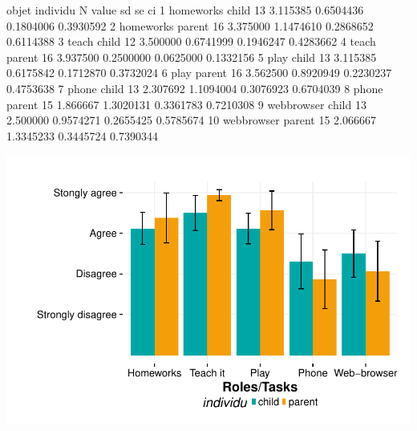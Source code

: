 \documentclass{article}
\begin{document}
\begin{Schunk}
\begin{Soutput}
        objet individu  N    value        sd        se        ci
1   homeworks    child 13 3.115385 0.6504436 0.1804006 0.3930592
2   homeworks   parent 16 3.375000 1.1474610 0.2868652 0.6114388
3       teach    child 12 3.500000 0.6741999 0.1946247 0.4283662
4       teach   parent 16 3.937500 0.2500000 0.0625000 0.1332156
5        play    child 13 3.115385 0.6175842 0.1712870 0.3732024
6        play   parent 16 3.562500 0.8920949 0.2230237 0.4753638
7       phone    child 13 2.307692 1.1094004 0.3076923 0.6704039
8       phone   parent 15 1.866667 1.3020131 0.3361783 0.7210308
9  webbrowser    child 13 2.500000 0.9574271 0.2655425 0.5785674
10 webbrowser   parent 15 2.066667 1.3345233 0.3445724 0.7390344
\end{Soutput}
\end{Schunk}
\includegraphics{interviews-plot_functionality_parent_enfant_bar}
\end{document}
